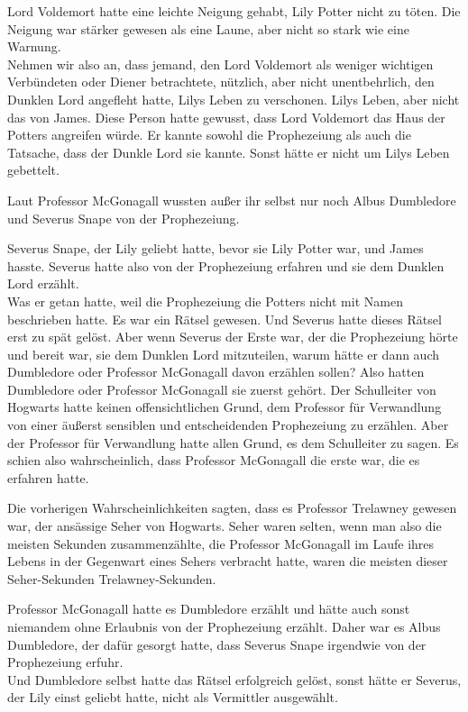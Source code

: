 {Lord Voldemort hatte eine leichte Neigung gehabt, Lily Potter nicht zu töten. Die Neigung war stärker gewesen als eine Laune, aber nicht so stark wie eine Warnung.\\ Nehmen wir also an, dass jemand, den Lord Voldemort als weniger wichtigen Verbündeten oder Diener betrachtete, nützlich, aber nicht unentbehrlich, den Dunklen Lord angefleht hatte, Lilys Leben zu verschonen. Lilys Leben, aber nicht das von James. Diese Person hatte gewusst, dass Lord Voldemort das Haus der Potters angreifen würde. Er kannte sowohl die Prophezeiung als auch die Tatsache, dass der Dunkle Lord sie kannte. Sonst hätte er nicht um Lilys Leben gebettelt.

Laut Professor McGonagall wussten außer ihr selbst nur noch Albus Dumbledore und Severus Snape von der Prophezeiung.

Severus Snape, der Lily geliebt hatte, bevor sie Lily Potter war, und James hasste. Severus hatte also von der Prophezeiung erfahren und sie dem Dunklen Lord erzählt.\\ Was er getan hatte, weil die Prophezeiung die Potters nicht mit Namen beschrieben hatte. Es war ein Rätsel gewesen. Und Severus hatte dieses Rätsel erst zu spät gelöst. Aber wenn Severus der Erste war, der die Prophezeiung hörte und bereit war, sie dem Dunklen Lord mitzuteilen, warum hätte er dann auch Dumbledore oder Professor McGonagall davon erzählen sollen? Also hatten Dumbledore oder Professor McGonagall sie zuerst gehört. Der Schulleiter von Hogwarts hatte keinen offensichtlichen Grund, dem Professor für Verwandlung von einer äußerst sensiblen und entscheidenden Prophezeiung zu erzählen. Aber der Professor für Verwandlung hatte allen Grund, es dem Schulleiter zu sagen. Es schien also wahrscheinlich, dass Professor McGonagall die erste war, die es erfahren hatte.

Die vorherigen Wahrscheinlichkeiten sagten, dass es Professor Trelawney gewesen war, der ansässige Seher von Hogwarts. Seher waren selten, wenn man also die meisten Sekunden zusammenzählte, die Professor McGonagall im Laufe ihres Lebens in der Gegenwart eines Sehers verbracht hatte, waren die meisten dieser Seher-Sekunden Trelawney-Sekunden.

Professor McGonagall hatte es Dumbledore erzählt und hätte auch sonst niemandem ohne Erlaubnis von der Prophezeiung erzählt. Daher war es Albus Dumbledore, der dafür gesorgt hatte, dass Severus Snape irgendwie von der Prophezeiung erfuhr.\\ Und Dumbledore selbst hatte das Rätsel erfolgreich gelöst, sonst hätte er Severus, der Lily einst geliebt hatte, nicht als Vermittler ausgewählt.

}
